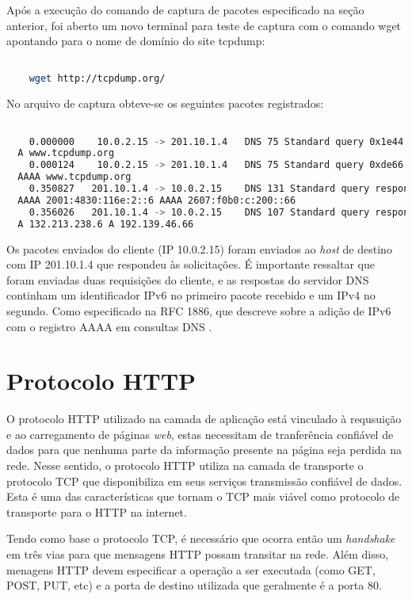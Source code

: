 \documentclass[a4paper]{report} %
\begin{document}
Após a execução do comando de captura de pacotes especificado na seção anterior, foi aberto um novo terminal para teste de captura com o comando wget apontando para o nome de domínio do site tcpdump:
\begin{lstlisting}[language=bash]

	wget http://tcpdump.org/

\end{lstlisting}

	No arquivo de captura obteve-se os seguintes pacotes registrados:

\begin{lstlisting}[language=bash]

	0.000000    10.0.2.15 -> 201.10.1.4   DNS 75 Standard query 0x1e44
  A www.tcpdump.org
	0.000124    10.0.2.15 -> 201.10.1.4   DNS 75 Standard query 0xde66
  AAAA www.tcpdump.org
	0.350827   201.10.1.4 -> 10.0.2.15    DNS 131 Standard query response 0xde66
  AAAA 2001:4830:116e:2::6 AAAA 2607:f0b0:c:200::66
	0.356026   201.10.1.4 -> 10.0.2.15    DNS 107 Standard query response 0x1e44
  A 132.213.238.6 A 192.139.46.66

\end{lstlisting}

	Os pacotes enviados do cliente (IP 10.0.2.15) foram enviados ao \textit{host} de destino com IP 201.10.1.4 que respondeu às solicitações. É importante ressaltar que foram enviadas duas requisições do cliente, e as respostas do servidor DNS continham um identificador IPv6 no primeiro pacote recebido e um IPv4 no segundo. Como especificado na RFC 1886, que descreve sobre a adição de IPv6 com o registro AAAA em consultas DNS \cite{IETF}.

\section{Protocolo HTTP}
\label{sec_http}
O protocolo HTTP utilizado na camada de aplicação está vinculado à requsuição e ao carregamento de páginas \textit{web}, estas necessitam de tranferência confiável de dados para que nenhuma parte da informação presente na página seja perdida na rede. Nesse sentido, o protocolo HTTP utiliza na camada de transporte o protocolo TCP que disponibiliza em seus serviços transmissão confiável de dados. Esta é uma das características que tornam o TCP mais viável como protocolo de transporte para o HTTP na internet.

	Tendo como base o protocolo TCP, é necessário que ocorra então um \textit{handshake} em três vias para que mensagens HTTP possam transitar na rede. Além disso, menagens HTTP devem especificar a operação a ser executada (como GET, POST, PUT, etc) e a porta de destino utilizada que geralmente é a porta 80.
\end{document}
